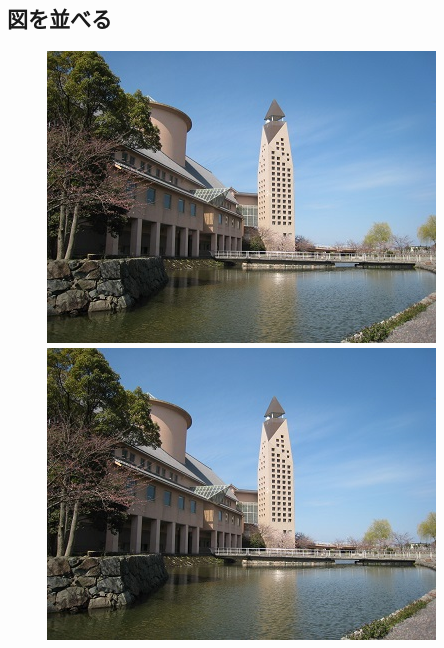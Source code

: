\documentclass[uplatex,11pt,a4j]{jsarticle}
\begin{document}
\subsection{図を並べる}
\begin{figure}[htbp]
  \centering
  \begin{minipage}{0.3\hsize}
    \includegraphics[width=\hsize]{./figures/kendai_a22.jpg}
  \end{minipage}
  \begin{minipage}{0.3\hsize}
    \includegraphics[width=\hsize]{./figures/kendai_a22.jpg}
  \end{minipage}
  \begin{minipage}{0.3\hsize}

\end{minipage}
\end{figure}
\end{document}
